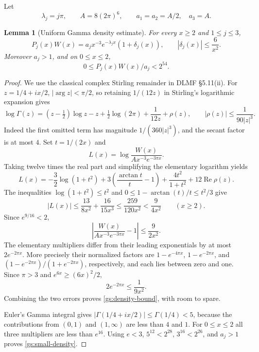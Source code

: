 \documentclass[11pt,a4paper]{article}
\newtheorem{lemma}[theorem]{Lemma}
\theoremstyle{definition}
\theoremstyle{remark}
\numberwithin{equation}{section}
\begin{document}
Let
\begin{equation}\label{gs:scales}
 \lambda_j=j\pi,\qquad A=8(2\pi)^6,
 \qquad a_1=a_2=A/2,\quad a_3=A.
\end{equation}

\begin{lemma}[Uniform Gamma density estimate]\label{gs:density}
For every $x\ge2$ and $1\le j\le3$,
\begin{equation}\label{gs:density-bound}
 P_j(x)W(x)=a_jx^{-3}e^{-\lambda_jx}(1+\delta_j(x)),
 \qquad |\delta_j(x)|\le\frac6{x^2}.
\end{equation}
Moreover $a_j>1$, and on $0\le x\le2$,
\begin{equation}\label{gs:small-density}
                  0\le P_j(x)W(x)/a_j<2^{54}.
\end{equation}
\end{lemma}

\begin{proof}
We use the classical complex Stirling remainder in DLMF
\S5.11(ii).  For $z=1/4+ix/2$, $|\arg z|<\pi/2$, so retaining
$1/(12z)$ in Stirling's logarithmic expansion gives
\[
 \log\Gamma(z)=(z-\tfrac12)\log z-z+\tfrac12\log(2\pi)
                         +\frac1{12z}+\rho(z),
 \qquad |\rho(z)|\le\frac1{90|z|^3}.
\]
Indeed the first omitted term has magnitude $1/(360|z|^3)$,
and the secant factor is at most $4$.
Set $t=1/(2x)$ and
\[
 L(x)=\log\frac{W(x)}{Ax^{-3}e^{-3\pi x}}.
\]
Taking twelve times the real part and simplifying the elementary
logarithm yields
\[
 L(x)=-\frac32\log(1+t^2)
       +3\left(\frac{\arctan t}{t}-1\right)
       +\frac{4t^2}{1+t^2}+12\operatorname{Re}\rho(z).
\]
The inequalities $\log(1+t^2)\le t^2$ and
$0\le1-\arctan(t)/t\le t^2/3$ give
\[
 |L(x)|\le\frac{13}{8x^2}+\frac{16}{15x^3}
        \le\frac{259}{120x^2}<\frac9{4x^2}\qquad(x\ge2).
\]
Since $e^{9/16}<2$,
\[
 \left|\frac{W(x)}{Ax^{-3}e^{-3\pi x}}-1\right|
        \le\frac9{2x^2}.
\]
The elementary multipliers differ from their leading exponentials by
at most $2e^{-2\pi x}$.  More precisely their normalized factors are
$1-e^{-4\pi x}$, $1-e^{-2\pi x}$, and
$(1-e^{-2\pi x})/(1+e^{-2\pi x})$, respectively, and each lies
between zero and one.  Since $\pi>3$ and
$e^{6x}\ge(6x)^2/2$,
\[
                    2e^{-2\pi x}\le\frac1{9x^2}.
\]
Combining the two errors proves \eqref{gs:density-bound}, with
room to spare.

Euler's Gamma integral gives
$|\Gamma(1/4+ix/2)|\le\Gamma(1/4)<5$, because the contributions
from $(0,1)$ and $(1,\infty)$ are less than $4$ and $1$.
For $0\le x\le2$ all three multipliers are less than $e^{16}$.
Using $e<3$, $5^{12}<2^{28}$, $3^{16}<2^{26}$, and $a_j>1$
proves \eqref{gs:small-density}.
\end{proof}
\end{document}
